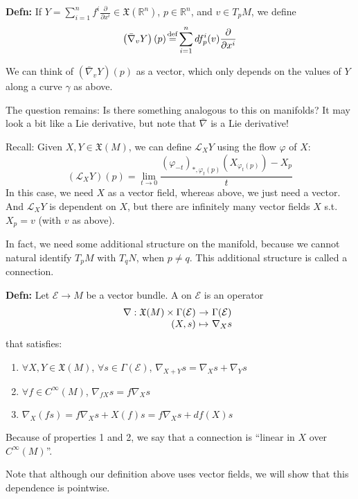 \documentclass[10pt,letterpaper]{article}
\newcommand{\n}{\hfill\break}
\newcommand{\up}{\vspace{-\baselineskip}}
\newcommand{\hangblock}[2]{\par\noindent\settowidth{\hangindent}{\textbf{#1: }}\textbf{#1: }\nolinebreak#2}
\newcommand{\defn}[1]{\hangblock{Defn}{#1}}
\newcommand{\ptxt}[1]{\textrm{\textnormal{#1}}}
\newcommand{\reals}{\mathbb{R}}
\newcommand{\R}{\reals}
\newcommand{\map}[4]{\!\!\!\begin{array}[t]{rcl}#1 & \!\!\!\!\to & \!\!\!\!#2\\ {}#3 & \!\!\!\!\mapsto & \!\!\!\!#4\end{array}}
\newcommand{\pd}[2]{\frac{\partial{}#1}{\partial{}#2}}
\newcommand{\del}{\nabla}
\newcommand{\st}{s.t.}
\newcommand{\labeledeq}[1]{\overset{\mathclap{\ptxt{#1}}}{=}}
\newcommand{\eqdef}{\labeledeq{def}}
\newcommand{\paren}[1]{\left(#1\right)}
\let\u\relax
\newcommand{\u}[1]{\underline{#1}}
\let\b\relax
\newcommand{\b}[1]{\textbf{#1}}
\begin{document}
\defn{
	If $Y=\sum_{i=1}^{n}f^{i}\pd{}{x^{i}}\in\mathfrak{X}(\R^{n})$, $p\in\R^{n}$, and $v\in{}T_{p}M$, we define
	\[
		\paren{\bar\nabla_{v}Y}(p)\eqdef\sum_{i=1}^{n}df^{i}_{p}(v)\pd{}{x^{i}}
	\]
}

\par\noindent
We can think of $\paren{\bar\nabla_{v}Y}(p)$ as a vector, which only depends on the values of $Y$ along a curve $\gamma$ as above.\n

\par\noindent
The question remains: Is there something analogous to this on manifolds? It may look a bit like a Lie derivative, but note that $\bar\nabla$ is \b{not} a Lie derivative!\n

\par\noindent
Recall: Given $X,Y\in\mathfrak{X}(M)$, we can define $\mathcal{L}_{X}Y$ using the flow $\varphi$ of $X$:
\[
	(\mathcal{L}_{X}Y)(p)=\lim_{t\to{}0}\frac{(\varphi_{-t})_{*,\varphi_{t}(p)}(X_{\varphi_{t}(p)})-X_{p}}{t}
\]
In this case, we need $X$ as a vector field, whereas above, we just need a vector. And $\mathcal{L}_{X}Y$ is dependent on $X$, but there are infinitely many vector fields $X$ \st{} $X_{p}=v$ (with $v$ as above).\n

\par\noindent
In fact, we need some additional structure on the manifold, because we cannot natural identify $T_{p}M$ with $T_{q}N$, when $p\ne{}q$. This additional structure is called a connection.\n

\defn{
	Let $\mathcal{E}\to{}M$ be a vector bundle. A \u{connection} on $\mathcal{E}$ is an operator
	\[
		\map{\del:\mathfrak{X}(M)\times\Gamma(\mathcal{E})}{\Gamma(\mathcal{E})}{(X,s)}{\nabla_{X}s}
	\]
	that satisfies:
	\begin{enumerate}[topsep=0pt, itemsep=0pt, leftmargin=4\parindent, label=\arabic*)]
		\item $\forall{}X,Y\in\mathfrak{X}(M)$, $\forall{}s\in\Gamma(\mathcal{E})$, $\nabla_{X+Y}s=\nabla_{X}s+\nabla_{Y}s$
		\item $\forall{}f\in{}C^{\infty}(M)$, $\nabla_{fX}s=f\nabla_{X}s$
		\item $\nabla_{X}(fs)=f\nabla_{X}s+X(f)s=f\nabla_{X}s+df(X)s$
	\end{enumerate}\up\n
	Because of properties 1 and 2, we say that a connection is ``linear in $X$ over $C^{\infty}(M)$''.\n
}

\par\noindent
Note that although our definition above uses vector fields, we will show that this dependence is pointwise.\n
\end{document}
